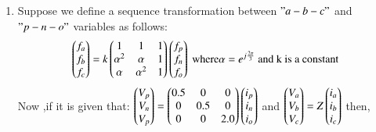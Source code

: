 \documentclass[journal]{IEEEtran}
\numberwithin{equation}{enumi}
\numberwithin{figure}{enumi}
\begin{document}
\begin{enumerate}
\begin{figure}[!ht]
    \caption{}
    \label{fig:7}
    \end{figure}
\begin{enumerate}
\end{enumerate}
\bigskip
\item Suppose we define a sequence transformation between $"a-b-c"$ and $"p-n-o"$ variables as follows:
\begin{align*}
    \begin{pmatrix}f_a\\f_b\\f_c\end{pmatrix}=k\begin{pmatrix}1&1&1\\{\alpha}^2&\alpha&1\\\alpha&{\alpha}^2&1\end{pmatrix}\begin{pmatrix}f_p\\f_n\\f_o\end{pmatrix}\text{ where} \alpha=e^{j\frac{2\pi}{3}} \text{ and k is a constant}
\end{align*}
Now ,if it is given that: $\begin{pmatrix}V_p\\V_n\\V_p\end{pmatrix}=\begin{pmatrix}0.5&0&0\\0&0.5&0\\0&0&2.0\end{pmatrix}\begin{pmatrix}i_p\\i_n\\i_o\end{pmatrix}$ and $\begin{pmatrix}V_a\\V_b\\V_c\end{pmatrix}=Z\begin{pmatrix}i_a\\i_b\\i_c\end{pmatrix}$ then, 
\begin{enumerate}
\end{enumerate}
\end{enumerate}
\end{document}
